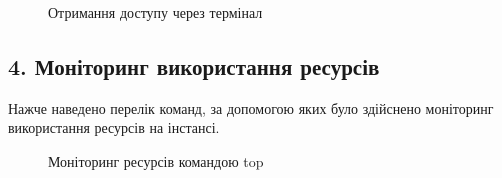 \documentclass[a4paper,14pt]{extarticle}
\begin{document}
\begin{figure}[H]
    \caption{Отримання доступу через термінал}
    \label{fig:connect to instance by termanal}
\end{figure}

\subsection*{4. Моніторинг використання ресурсів}

Нажче наведено перелік команд, за допомогою яких було 
здійснено моніторинг використання ресурсів на інстансі.

\begin{figure}[h]
    \caption{Моніторинг ресурсів командою top}
    \label{fig:top}
\end{figure}
\end{document}
